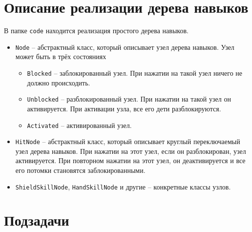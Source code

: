 \documentclass{article}
\begin{document}
\section*{Описание реализации дерева навыков}
В папке \texttt{code} находится реализация простого дерева навыков.
\begin{itemize}
\item \texttt{Node} -- абстрактный класс, который описывает узел дерева навыков. Узел может быть в трёх состояниях
\begin{itemize}
\item \texttt{Blocked} -- заблокированный узел. При нажатии на такой узел ничего не должно происходить.
\item \texttt{Unblocked} -- разблокированный узел. При нажатии на такой узел он активируется. При активации узла, все его дети разблокируются.
\item \texttt{Activated} -- активированный узел.
\end{itemize}
\item \texttt{HitNode} -- абстрактный класс, который описывает круглый переключаемый узел дерева навыков. При нажатии на этот узел, если он разблокирован, узел активируется. При повторном нажатии на этот узел, он деактивируется и все его потомки становятся заблокированными.

\item \texttt{ShieldSkillNode}, \texttt{HandSkillNode} и другие -- конкретные классы узлов.
\end{itemize}



\section*{Подзадачи}
\end{document}
